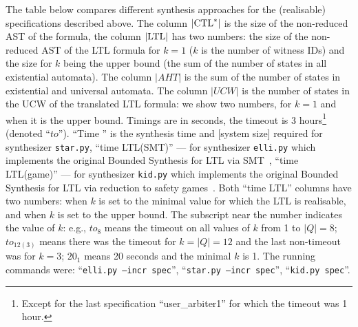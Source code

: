 The table below compares different synthesis approaches for the (realisable) \CTLstar specifications described above.
The column $|{\text{CTL}^*}|$ is the size of the non-reduced AST of the \CTLstar formula,
the column $|\text{LTL}|$ has two numbers:
the size of the non-reduced AST of the LTL formula for $k=1$ ($k$ is the number of witness IDs)
and the size for $k$ being the upper bound (the sum of the number of states in all existential automata).
The column $|AHT|$ is the sum of the number of states in existential and universal automata.
The column $|UCW|$ is the number of states in the UCW of the translated LTL formula:
we show two numbers, for $k=1$ and when it is the upper bound.
Timings are in seconds, the timeout is 3 hours\footnote{Except for the last specification ``user\_arbiter1'' for which the timeout was 1 hour.} (denoted ``$to$'').
``Time \CTLstar'' is the synthesis time and [system size] required for
\CTLstar synthesizer {\small \tt star.py},
``time LTL(SMT)'' --- for synthesizer {\small\tt elli.py} which implements the original Bounded Synthesis for LTL via SMT~\cite{BS},
``time LTL(game)'' --- for synthesizer {\small\tt kid.py} which implements the original Bounded Synthesis for LTL via reduction to safety games~\cite{BS}.
Both ``time LTL'' columns have two numbers:
when $k$ is set to the minimal value for which the LTL is realisable,
and when $k$ is set to the upper bound.
The subscript near the number indicates the value of $k$:
e.g., $to_8$ means the timeout on all values of $k$ from 1 to $|Q|=8$;
$to_{12(3)}$ means there was the timeout for $k=|Q|=12$
and the last non-timeout was for $k=3$;
$20_1$ means 20 seconds and the minimal $k$ is 1.
The running commands were:
  ``{\small \tt elli.py --incr spec}'',
  ``{\small \tt star.py --incr spec}'',
  ``{\small \tt kid.py spec}''.

